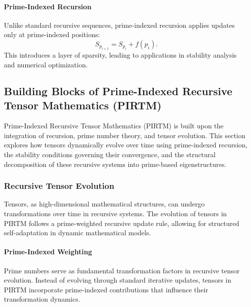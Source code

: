 \documentclass[12pt]{article}
\begin{document}
\paragraph{Prime-Indexed Recursion}
Unlike standard recursive sequences, prime-indexed recursion applies updates only at prime-indexed positions:
\[
S_{p_{i+1}} = S_{p_i} + f(p_i).
\]
This introduces a layer of sparsity, leading to applications in stability analysis and numerical optimization.

\subsection{Building Blocks of Prime-Indexed Recursive Tensor Mathematics (PIRTM)}

Prime-Indexed Recursive Tensor Mathematics (PIRTM) is built upon the integration of recursion, prime number theory, and tensor evolution. This section explores how tensors dynamically evolve over time using prime-indexed recursion, the stability conditions governing their convergence, and the structural decomposition of these recursive systems into prime-based eigenstructures.

\subsubsection{Recursive Tensor Evolution}

Tensors, as high-dimensional mathematical structures, can undergo transformations over time in recursive systems. The evolution of tensors in PIRTM follows a prime-weighted recursive update rule, allowing for structured self-adaptation in dynamic mathematical models.

\paragraph{Prime-Indexed Weighting}
Prime numbers serve as fundamental transformation factors in recursive tensor evolution. Instead of evolving through standard iterative updates, tensors in PIRTM incorporate prime-indexed contributions that influence their transformation dynamics.
\end{document}
